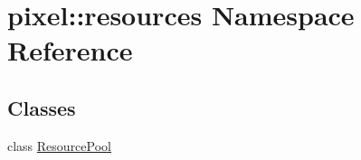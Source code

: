 \hypertarget{namespacepixel_1_1resources}{}\section{pixel\+:\+:resources Namespace Reference}
\label{namespacepixel_1_1resources}
\subsection*{Classes}
\begin{DoxyCompactItemize}
\item 
class \hyperlink{classpixel_1_1resources_1_1_resource_pool}{Resource\+Pool}
\end{DoxyCompactItemize}

